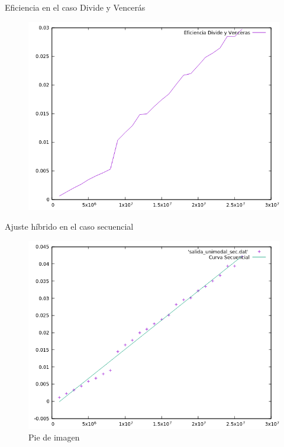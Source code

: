 \documentclass[12pt]{beamer}
\begin{document}
\begin{frame}{Eficiencia en el caso Divide y Vencerás}

\begin{figure}[H] 
\centering
\includegraphics[angle=0,scale=0.5]{img/Eficiencia_dyv.png} 
\end{figure}

\end{frame}

\begin{frame}{Ajuste híbrido en el caso secuencial}

\begin{figure}[H] 
\centering
\includegraphics[angle=0,scale=0.5]{img/AjusteHibridoSec.png} 
\caption{Pie de imagen} 
\end{figure}

\end{frame}
\end{document}
